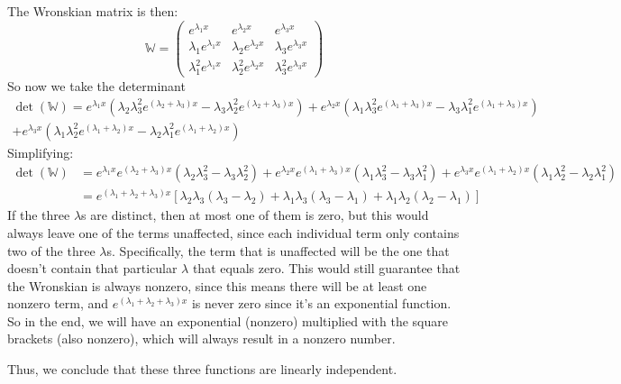 \documentclass{article}
\begin{document}
\begin{solution}
	The Wronskian matrix is then: 
	\[
		\mathbb W = \begin{pmatrix} e^{\lambda_1 x} & e^{\lambda_2x} & e^{\lambda_3x}\\
		\lambda_1 e^{\lambda_1x} & \lambda_2e^{\lambda_2x} & \lambda_3e^{\lambda_3x}\\
	\lambda_1^2 e^{\lambda_1x} & \lambda_2^2 e^{\lambda_2x} & \lambda_3^2e^{\lambda_3x}\end{pmatrix} 
	\] 
	So now we take the determinant
	\begin{multline*}
		\det(\mathbb W) = e^{\lambda_1x}\left( \lambda_2\lambda_3^2 e^{(\lambda_2 + \lambda_3)x} - \lambda_3\lambda_2^2
			e^{(\lambda_2 + \lambda_3)x}\right) + 
			e^{\lambda_2x} \left( \lambda_1 \lambda_3^2 e^{(\lambda_1 + \lambda_3)x} - \lambda_3\lambda_1^2
		e^{(\lambda_1 + \lambda_3)x}\right) \\
		+ e^{\lambda_3 x}\left(\lambda_1\lambda_2^2 e^{(\lambda_1 + \lambda_2)x} - 
			\lambda_2\lambda_1^2 e^{(\lambda_1 + \lambda_2)x}\right)
	\end{multline*}
	Simplifying:
	\begin{align*}
		\det(\mathbb W) &= e^{\lambda_1x}e^{(\lambda_2 +\lambda_3)x}\left( \lambda_2\lambda_3^2 - 
		\lambda_3\lambda_2^2\right) + e^{\lambda_2x} e^{(\lambda_1 + \lambda_3)x} \left( \lambda_1\lambda_3^2 -
		\lambda_3\lambda_1^2\right) + e^{\lambda_3x}e^{(\lambda_1 + \lambda_2)x}\left( \lambda_1 \lambda_2^2 - 
			\lambda_2 \lambda_1^2\right)\\
		&= e^{(\lambda_1 + \lambda_2 + \lambda_3)x} \left[ \lambda_2\lambda_3(\lambda_3 - \lambda_2) + 
		\lambda_1 \lambda_3(\lambda_3 - \lambda_1) + \lambda_1 \lambda_2(\lambda_2 - \lambda_1)\right]
	\end{align*}
	If the three $\lambda$s are distinct, then at most one of them is zero, but this would always leave 
	one of the terms unaffected, since each individual term only contains two of the three $\lambda$s. 
	Specifically, the term that is unaffected will be the one that doesn't contain that particular $\lambda$
	that equals zero. This would still guarantee that the Wronskian is always nonzero, since this means
	there will be at least one nonzero term, and $e^{(\lambda_1 + \lambda_2 + \lambda_3)x}$ is never zero 
	since it's an exponential function. So in the end, we will have an exponential (nonzero) multiplied with 
	the square brackets (also nonzero), which will always result in a nonzero number. 

	Thus, we conclude that these three functions are linearly independent. 
\end{solution}
\bigskip
\dphline
\pagebreak
\end{document}
